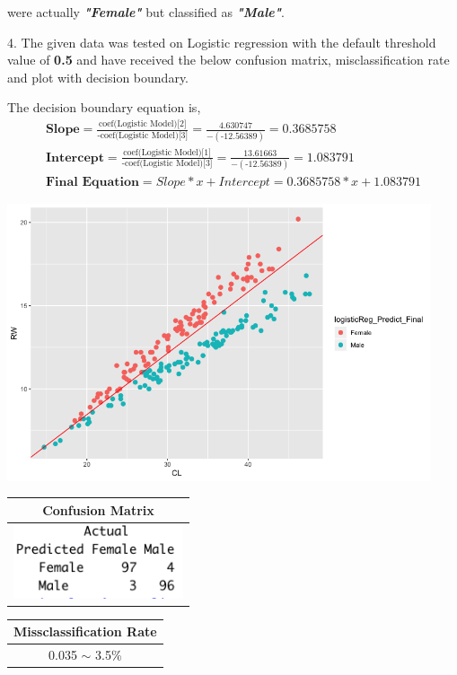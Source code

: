 \documentclass[a4paper,10pt]{article}
\begin{document}
were actually \textbf{\textit{"Female"}} but classified as \textbf{\textit{"Male"}}.\par
\vspace{0.5cm}
4. The given data was tested on Logistic regression with the default threshold value of \textbf{0.5} and have received
the below confusion matrix, misclassification rate and plot with decision boundary. \par
The decision boundary equation is,
    \begin{align*}
      \textbf{Slope} = \frac{\text{coef(Logistic Model)[2]}}{\text{-coef(Logistic Model)[3]}} = \frac{\text{4.630747}}{-(\text{-12.56389})} = 0.3685758 \\
      \textbf{Intercept} = \frac{\text{coef(Logistic Model)[1]}}{\text{-coef(Logistic Model)[3]}} = \frac{\text{13.61663}}{-(\text{-12.56389})} = 1.083791\\
      \textbf{Final Equation} = Slope*x+Intercept = 0.3685758*x+1.083791
    \end{align*}
  \begin{center}
    \includegraphics[width=125mm,scale=0.10]{CL_RW_Logistic_Regression_Plot.png} 
    \begin{tabular}{|c|}
      \hline
      \textbf{Confusion Matrix} \\
      \hline
      \includegraphics[width=50mm,scale=0.10]{CL_RW_Logistic_Regression_CM.png} \\
      \hline
    \end{tabular} \par
    \begin{tabular}{|c|}
      \hline
      \textbf{Missclassification Rate} \\
      \hline
      0.035 $\sim$ 3.5\% \\
      \hline
    \end{tabular}
  \end{center}
\end{document}
